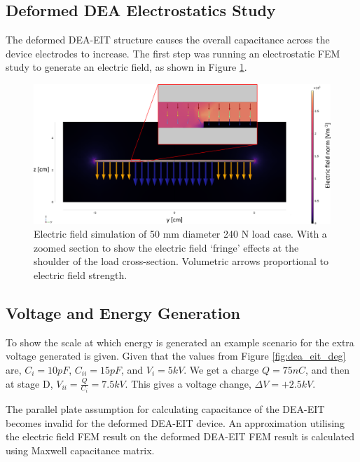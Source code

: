 \subsection{Deformed DEA Electrostatics Study}
The deformed DEA-EIT structure causes the overall capacitance across the device electrodes to increase. The first step was running an electrostatic FEM study to generate an electric field, as shown in Figure \ref{fig:FEM_DEA-EIT_cap}.
\begin{figure}[H]
	\centering
	\includegraphics[width=\linewidth]{Figures/d50mm_load_labelled_shoulder_zoom.png}
	\caption{Electric field simulation of 50 mm diameter 240 N load case. With a zoomed section to show the electric field `fringe' effects at the shoulder of the load cross-section. Volumetric arrows proportional to electric field strength.}
	\label{fig:FEM_DEA-EIT_cap}
\end{figure}


\subsection{Voltage and Energy Generation}
\label{subsec:Voltage and Energy Generation}
To show the scale at which energy is generated an example scenario for the extra voltage generated is given. Given that the values from Figure \ref{fig:dea_eit_deg} are, $C_i = 10 pF$, $C_{ii} = 15 pF$, and $V_i = 5 kV$. We get a charge $Q = 75 nC$, and then at stage D, $V_{ii} = \frac{Q}{C_{i}} = 7.5 kV$. This gives a voltage change, $\Delta V = +2.5 kV$.

The parallel plate assumption for calculating capacitance of the DEA-EIT becomes invalid for the deformed DEA-EIT device. An approximation utilising the electric field FEM result on the deformed DEA-EIT FEM result is calculated using Maxwell capacitance matrix.

